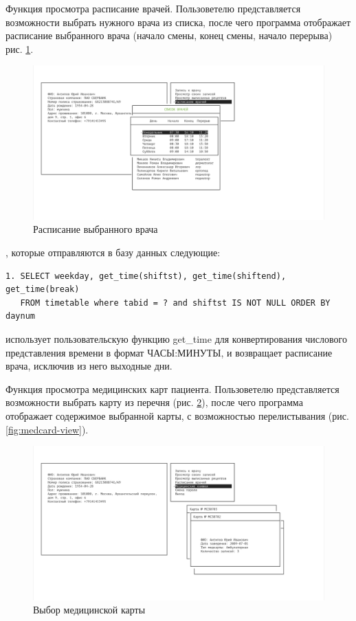 \documentclass[14pt,a4paper,russian]{extreport}
\begin{document}
Функция просмотра расписание врачей. Пользоветелю представляется возможности выбрать нужного врача из списка, после чего программа отображает расписание выбранного врача (начало смены, конец смены, начало перерыва) рис. \ref{fig:timetable-show}.\par
\begin{figure}[h!]
        \includegraphics[width=\textwidth]{prog_int/timetable}
        \caption{Расписание выбранного врача}
        \label{fig:timetable-show}
\end{figure}
, которые отправляются в базу данных следующие: 
\begin{lstlisting}[style=csql] 
1. SELECT weekday, get_time(shiftst), get_time(shiftend), get_time(break)
   FROM timetable where tabid = ? and shiftst IS NOT NULL ORDER BY daynum
\end{lstlisting}
 использует пользовательскую функцию get\_time для конвертирования числового представления времени в формат ЧАСЫ:МИНУТЫ, и возвращает расписание врача, исключив из него выходные дни.\par\par
Функция просмотра медицинских карт пациента. Пользоветелю представляется возможности выбрать карту из перечня (рис. \ref{fig:medcard-list}), после чего программа отображает содержимое выбранной карты, с возможностью перелистывания (рис. \ref{fig:medcard-view}).\par
\begin{figure}[h!]
        \includegraphics[width=\textwidth]{prog_int/medcard-list}
        \caption{Выбор медицинской карты}
        \label{fig:medcard-list}
\end{figure}
\end{document}
